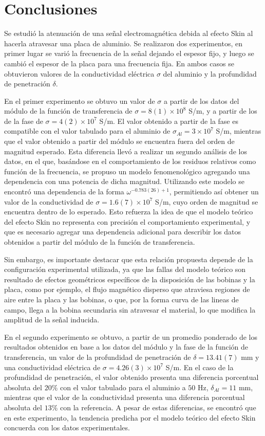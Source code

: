 \section{Conclusiones}

Se estudió la atenuación de una señal electromagnética debida al efecto Skin al hacerla atravesar una placa de aluminio. Se realizaron dos experimentos, en primer lugar se varió la frecuencia de la señal dejando el espesor fijo, y luego se cambió el espesor de la placa para una frecuencia fija. En ambos casos se obtuvieron valores de la conductividad eléctrica \(\sigma\) del aluminio y la profundidad de penetración \(\delta\).

En el primer experimento se obtuvo un valor de \(\sigma\) a partir de los datos del módulo de la función de transferencia de \(\sigma=8(1)\times 10^8 \) S/m, y a partir de los de la fase de \(\sigma=4(2)\times 10^7 \) S/m. El valor obtenido a partir de la fase es compatible con el valor tabulado para el aluminio de \(\sigma_{Al}=3\times 10^7 \) S/m, mientras que el valor obtenido a partir del módulo se encuentra fuera del orden de magnitud esperado. Esta diferencia llevó a realizar un segundo análisis de los datos, en el que, basándose en el comportamiento de los residuos relativos como función de la frecuencia, se propuso un modelo fenomenológico agregando una dependencia con una potencia de dicha magnitud. Utilizando este modelo se encontró una dependencia de la forma \(\omega^{-0.783(26)+1}\), permitiendo así obtener un valor de la conductividad de \(\sigma = 1.6(7)\times 10^7 \) S/m, cuyo orden de magnitud se encuentra dentro de lo esperado. Esto refuerza la idea de que el modelo teórico del efecto Skin no representa con precisión el comportamiento experimental, y que es necesario agregar una dependencia adicional para describir los datos obtenidos a partir del módulo de la función de transferencia. 

Sin embargo, es importante destacar que esta relación propuesta depende de la configuración experimental utilizada, ya que las fallas del modelo teórico son resultado de efectos geométricos específicos de la disposición de las bobinas y la placa, como por ejemplo, el flujo magnético disperso que atraviesa regiones de aire entre la placa y las bobinas, o que, por la forma curva de las lineas de campo, llega a la bobina secundaria sin atravesar el material, lo que modifica la amplitud de la señal inducida. 

En el segundo experimento se obtuvo, a partir de un promedio ponderado de los resultados obtenidos en base a los datos del módulo y la fase de la función de transferencia, un valor de la profundidad de penetración de \(\delta=13.41(7)\) mm y una conductividad eléctrica de \(\sigma=4.26(3)\times 10^7 \) S/m. En el caso de la profundidad de penetración, el valor obtenido presenta una diferencia porcentual absoluta del \(20\%\) con el valor tabulado para el aluminio a \(50\) Hz, \(\delta_{Al}=11\) mm, mientras que el valor de la conductividad presenta una diferencia porcentual absoluta del \(13\%\) con la referencia. A pesar de estas diferencias, se encontró que en este experimento, la tendencia predicha por el modelo teórico del efecto Skin concuerda con los datos experimentales.